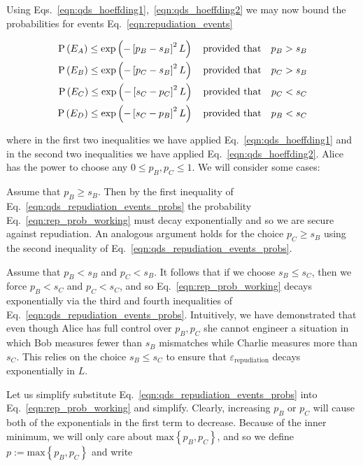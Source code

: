 Using Eqs.~\ref{eqn:qds_hoeffding1},~\ref{eqn:qds_hoeffding2} we may now bound the probabilities for events Eq.~\ref{eqn:repudiation_events}

\begin{align}\label{eqn:qds_repudiation_events_probs}
\text{P}\left(E_A\right) \le \text{exp}\left( -\left[p_B - s_B\right]^2 L \right) \qq{provided that} p_B > s_B \notag \\
\text{P}\left(E_B\right) \le \text{exp}\left( -\left[p_C - s_B\right]^2 L \right) \qq{provided that} p_C > s_B \notag \\
\text{P}\left(E_C\right) \le \text{exp}\left( -\left[s_C - p_C\right]^2 L \right) \qq{provided that} p_C < s_C \notag \\
\text{P}\left(E_D\right) \le \text{exp}\left( -\left[s_C - p_B\right]^2 L \right) \qq{provided that} p_B < s_C
\end{align}

\noindent where in the first two inequalities we have applied Eq.~\ref{eqn:qds_hoeffding1} and in the second two inequalities we have applied Eq.~\ref{eqn:qds_hoeffding2}. Alice has the power to choose any $0 \le p_B, p_C \le 1$. We will consider some cases:

Assume that $p_B \ge s_B$. Then by the first inequality of Eq.~\ref{eqn:qds_repudiation_events_probs} the probability Eq.~\ref{eqn:rep_prob_working} must decay exponentially %
and so we are secure against repudiation. An analogous argument holds for the choice $p_C \ge s_B$ using the second inequality of Eq.~\ref{eqn:qds_repudiation_events_probs}.

Assume that $p_B < s_B$ and $p_C < s_B$. It follows that if we choose $s_B \le s_C$, then we force $p_B < s_C$ and $p_C < s_C$, and so Eq.~\ref{eqn:rep_prob_working} decays exponentially via the third and fourth inequalities of Eq.~\ref{eqn:qds_repudiation_events_probs}. Intuitively, we have demonstrated that even though Alice has full control over $p_B, p_C$ she cannot engineer a situation in which Bob measures fewer than $s_B$ mismatches while Charlie measures more than $s_C$. This relies on the choice $s_B \le s_C$ to ensure that $\varepsilon_{\text{repudiation}}$ decays exponentially in $L$.


Let us simplify substitute Eq.~\ref{eqn:qds_repudiation_events_probs} into Eq.~\ref{eqn:rep_prob_working} and simplify. Clearly, increasing $p_B$ or $p_C$ will cause both of the exponentials in the first term to decrease. Because of the inner minimum, we will only care about $\text{max}\left\{p_B, p_C\right\}$, and so we define $p := \text{max}\left\{p_B, p_C\right\}$ and write

